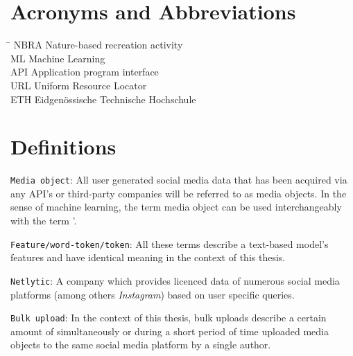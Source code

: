
\section*{Acronyms and Abbreviations}
\begin{tabbing}
 \hspace*{1.6cm}  \= \kill
 NBRA \> Nature-based recreation activity \\[0.5ex]
 ML \> Machine Learning \\
 API \> Application program interface \\
 URL \> Uniform Resource Locator \\
 ETH \> Eidgen\"{o}ssische Technische Hochschule
\end{tabbing}

\section*{Definitions}
\texttt{Media object}: All user generated social media data that has been acquired via any API\rq s or third-party companies will be referred to as media objects. In the sense of machine learning, the term media object can be used interchangeably with the term \lqdocument\rq.\newline

\texttt{Feature/word-token/token}: All these terms describe a text-based model\rq s features and have identical meaning in the context of this thesis.\newline

\texttt{Netlytic}: A company which provides licenced data of numerous social media platforms (among others \textit{Instagram}) based on user specific queries.\newline

\texttt{Bulk upload}: In the context of this thesis, bulk uploads describe a certain amount of simultaneously or during a short period of time uploaded media objects to the same social media platform by a single author.\newline




 \cleardoublepage

